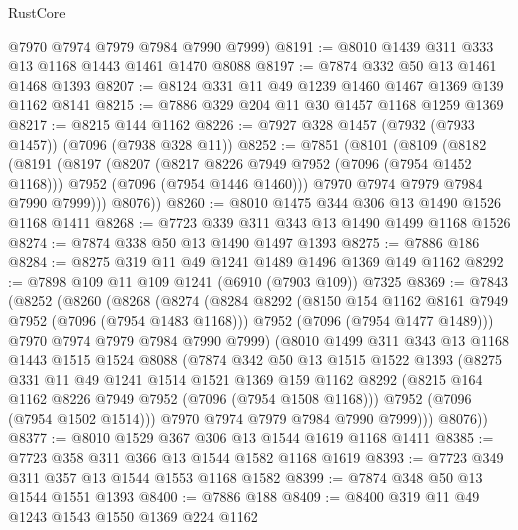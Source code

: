 \begin{lexlean}{RustCore}
\begin{coremodule}
      @7970
      @7974
      @7979
      @7984
      @7990
      @7999)
@8191 := @8010 @1439 @311 @333 @13 @1168 @1443 @1461 @1470 @8088
@8197 := @7874 @332 @50 @13 @1461 @1468 @1393
@8207 := @8124 @331 @11 @49 @1239 @1460 @1467 @1369 @139 @1162 @8141
@8215 := @7886 @329 @204 @11 @30 @1457 @1168 @1259 @1369
@8217 := @8215 @144 @1162
@8226 := @7927 @328 @1457 (@7932 (@7933 @1457)) (@7096 (@7938 @328 @11))
@8252 := @7851
    (@8101
      (@8109
        (@8182
          (@8191
            (@8197
              (@8207
                (@8217 @8226 @7949 @7952 (@7096 (@7954 @1452 @1168)))
                @7952
                (@7096 (@7954 @1446 @1460)))
              @7970
              @7974
              @7979
              @7984
              @7990
              @7999)))
        @8076))
@8260 := @8010 @1475 @344 @306 @13 @1490 @1526 @1168 @1411
@8268 := @7723 @339 @311 @343 @13 @1490 @1499 @1168 @1526
@8274 := @7874 @338 @50 @13 @1490 @1497 @1393
@8275 := @7886 @186
@8284 := @8275 @319 @11 @49 @1241 @1489 @1496 @1369 @149 @1162
@8292 := @7898 @109 @11 @109 @1241 (@6910 (@7903 @109)) @7325
@8369 := @7843
    (@8252
      (@8260
        (@8268
          (@8274
            (@8284
              @8292
              (@8150 @154 @1162 @8161 @7949 @7952 (@7096 (@7954 @1483 @1168)))
              @7952
              (@7096 (@7954 @1477 @1489)))
            @7970
            @7974
            @7979
            @7984
            @7990
            @7999)
          (@8010
            @1499
            @311
            @343
            @13
            @1168
            @1443
            @1515
            @1524
            @8088
            (@7874
              @342
              @50
              @13
              @1515
              @1522
              @1393
              (@8275
                @331
                @11
                @49
                @1241
                @1514
                @1521
                @1369
                @159
                @1162
                @8292
                (@8215 @164 @1162 @8226 @7949 @7952 (@7096 (@7954 @1508 @1168)))
                @7952
                (@7096 (@7954 @1502 @1514)))
              @7970
              @7974
              @7979
              @7984
              @7990
              @7999)))
        @8076))
@8377 := @8010 @1529 @367 @306 @13 @1544 @1619 @1168 @1411
@8385 := @7723 @358 @311 @366 @13 @1544 @1582 @1168 @1619
@8393 := @7723 @349 @311 @357 @13 @1544 @1553 @1168 @1582
@8399 := @7874 @348 @50 @13 @1544 @1551 @1393
@8400 := @7886 @188
@8409 := @8400 @319 @11 @49 @1243 @1543 @1550 @1369 @224 @1162

\end{coremodule}
\end{lexlean}
